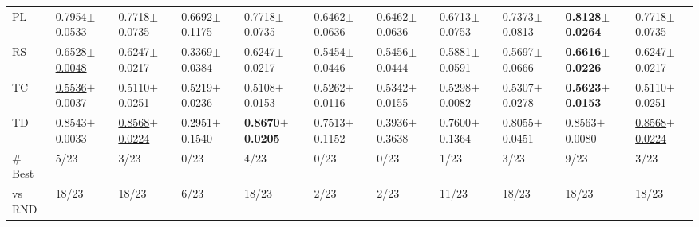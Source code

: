 \begin{tabular}{lllllllllll}
PL & \underline{0.7954$\pm$0.0533} & 0.7718$\pm$0.0735 & 0.6692$\pm$0.1175 & 0.7718$\pm$0.0735 & 0.6462$\pm$0.0636 & 0.6462$\pm$0.0636 & 0.6713$\pm$0.0753 & 0.7373$\pm$0.0813 & \textbf{0.8128$\pm$0.0264} & 0.7718$\pm$0.0735 \\
RS & \underline{0.6528$\pm$0.0048} & 0.6247$\pm$0.0217 & 0.3369$\pm$0.0384 & 0.6247$\pm$0.0217 & 0.5454$\pm$0.0446 & 0.5456$\pm$0.0444 & 0.5881$\pm$0.0591 & 0.5697$\pm$0.0666 & \textbf{0.6616$\pm$0.0226} & 0.6247$\pm$0.0217 \\
TC & \underline{0.5536$\pm$0.0037} & 0.5110$\pm$0.0251 & 0.5219$\pm$0.0236 & 0.5108$\pm$0.0153 & 0.5262$\pm$0.0116 & 0.5342$\pm$0.0155 & 0.5298$\pm$0.0082 & 0.5307$\pm$0.0278 & \textbf{0.5623$\pm$0.0153} & 0.5110$\pm$0.0251 \\
TD & 0.8543$\pm$0.0033 & \underline{0.8568$\pm$0.0224} & 0.2951$\pm$0.1540 & \textbf{0.8670$\pm$0.0205} & 0.7513$\pm$0.1152 & 0.3936$\pm$0.3638 & 0.7600$\pm$0.1364 & 0.8055$\pm$0.0451 & 0.8563$\pm$0.0080 & \underline{0.8568$\pm$0.0224} \\
\midrule
\# Best & 5/23 & 3/23 & 0/23 & 4/23 & 0/23 & 0/23 & 1/23 & 3/23 & 9/23 & 3/23 \\
vs RND & 18/23 & 18/23 & 6/23 & 18/23 & 2/23 & 2/23 & 11/23 & 18/23 & 18/23 & 18/23 \\
\bottomrule
\end{tabular}
